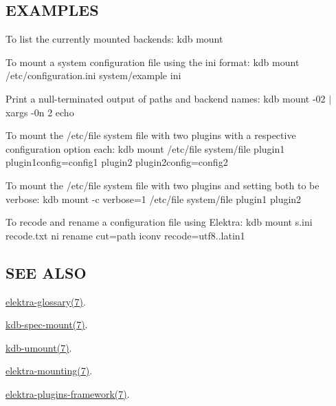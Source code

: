 \subsection*{E\+X\+A\+M\+P\+L\+E\+S}

To list the currently mounted backends\+: {\ttfamily kdb mount}

To mount a system configuration file using the ini format\+: {\ttfamily kdb mount /etc/configuration.ini system/example ini}

Print a null-\/terminated output of paths and backend names\+: {\ttfamily kdb mount -\/02 $\vert$ xargs -\/0n 2 echo}

To mount the /etc/file system file with two plugins with a respective configuration option each\+: {\ttfamily kdb mount /etc/file system/file plugin1 plugin1config=config1 plugin2 plugin2config=config2}

To mount the /etc/file system file with two plugins and setting both to be verbose\+: {\ttfamily kdb mount -\/c verbose=1 /etc/file system/file plugin1 plugin2}

To recode and rename a configuration file using Elektra\+: {\ttfamily kdb mount s.\+ini recode.\+txt ni rename cut=path iconv recode=utf8..latin1}

\subsection*{S\+E\+E A\+L\+S\+O}


\begin{DoxyItemize}
\item \hyperlink{md_doc_help_elektra-glossary_doc_help_elektra-glossary_md}{elektra-\/glossary(7)}.
\item \hyperlink{md_doc_help_kdb-spec-mount_doc_help_kdb-spec-mount_md}{kdb-\/spec-\/mount(7)}.
\item \hyperlink{md_doc_help_kdb-umount_doc_help_kdb-umount_md}{kdb-\/umount(7)}.
\item \hyperlink{md_doc_help_elektra-mounting_doc_help_elektra-mounting_md}{elektra-\/mounting(7)}.
\item \hyperlink{md_doc_help_elektra-plugins-framework_doc_help_elektra-plugins-framework_md}{elektra-\/plugins-\/framework(7)}. 
\end{DoxyItemize}